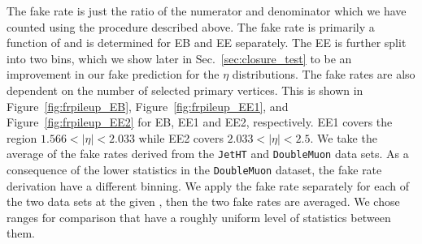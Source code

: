 The fake rate is just the ratio of the numerator and denominator which we have counted using the procedure described above. The fake rate is primarily a function of \pt and is determined for EB and EE separately. The EE is further split into two bins, which we show later in Sec.~\ref{sec:closure_test} to be an improvement in our fake prediction for the $\eta$ distributions. The fake rates are also dependent on the number of selected primary vertices. This is shown in Figure~\ref{fig:frpileup_EB}, Figure~\ref{fig:frpileup_EE1}, and Figure~\ref{fig:frpileup_EE2} for EB, EE1 and EE2, respectively. EE1 covers the region $1.566 < |\eta| < 2.033$ while EE2 covers $2.033 < \lvert \eta \rvert< 2.5$. We take the average of the fake rates derived from the \texttt{JetHT} and \texttt{DoubleMuon} data sets. As a consequence of the lower statistics in the \texttt{DoubleMuon} dataset, the fake rate derivation have a different \pt binning. We apply the fake rate separately for each of the two data sets at the given \pt, then the two fake rates are averaged. We chose ranges for comparison that have a roughly uniform level of statistics between them.

